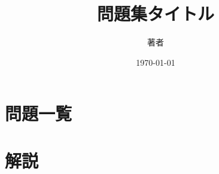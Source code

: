 \documentclass[10pt,a4paper,openany]{ltjsbook}
\title{問題集タイトル}
\author{著者}
\date{\today}
\begin{document}
\frontmatter
\maketitle
\mainmatter



\part*{問題一覧}


\part*{解説}

\end{document}
